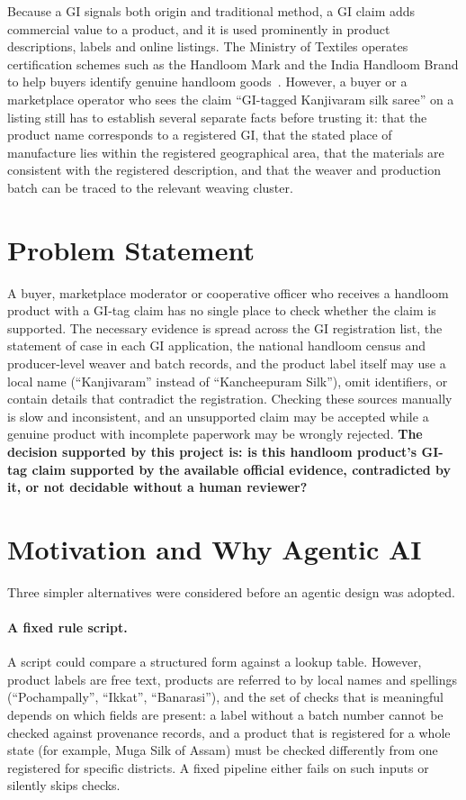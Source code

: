 Because a GI signals both origin and traditional method, a GI claim adds commercial value to a product,
and it is used prominently in product descriptions, labels and online listings. The Ministry of
Textiles operates certification schemes such as the Handloom Mark and the India Handloom Brand to help
buyers identify genuine handloom goods~\cite{handloommark}. However, a buyer or a marketplace operator
who sees the claim ``GI-tagged Kanjivaram silk saree'' on a listing still has to establish several
separate facts before trusting it: that the product name corresponds to a registered GI, that the
stated place of manufacture lies within the registered geographical area, that the materials are
consistent with the registered description, and that the weaver and production batch can be traced to
the relevant weaving cluster.

\section{Problem Statement}

A buyer, marketplace moderator or cooperative officer who receives a handloom product with a GI-tag
claim has no single place to check whether the claim is supported. The necessary evidence is spread
across the GI registration list, the statement of case in each GI application, the national handloom
census and producer-level weaver and batch records, and the product label itself may use a local
name (``Kanjivaram'' instead of ``Kancheepuram Silk''), omit identifiers, or contain details that
contradict the registration. Checking these sources manually is slow and inconsistent, and an
unsupported claim may be accepted while a genuine product with incomplete paperwork may be wrongly
rejected. \textbf{The decision supported by this project is: is this handloom product's GI-tag claim
supported by the available official evidence, contradicted by it, or not decidable without a human
reviewer?}

\section{Motivation and Why Agentic AI}

Three simpler alternatives were considered before an agentic design was adopted.

\paragraph{A fixed rule script.} A script could compare a structured form against a lookup table.
However, product labels are free text, products are referred to by local names and spellings
(``Pochampally'', ``Ikkat'', ``Banarasi''), and the set of checks that is meaningful depends on which
fields are present: a label without a batch number cannot be checked against provenance records, and
a product that is registered for a whole state (for example, Muga Silk of Assam) must be checked
differently from one registered for specific districts. A fixed pipeline either fails on such inputs or
silently skips checks.

